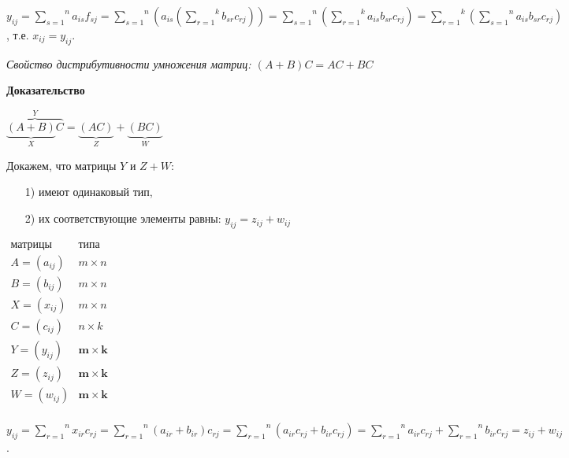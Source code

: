     $y_{ij} = \overset{n}{\underset{s = 1}{\sum}}a_{is}f_{sj} = \overset{n}{\underset{s = 1}{\sum}}(a_{is}(\overset{k}{\underset{r = 1}{\sum}}b_{sr}c_{rj})) = \overset{n}{\underset{s = 1}{\sum}}(\overset{k}{\underset{r = 1}{\sum}}a_{is}b_{sr}c_{rj}) = \overset{k}{\underset{r = 1}{\sum}}(\overset{n}{\underset{s = 1}{\sum}}a_{is}b_{sr}c_{rj})$, т.е. $x_{ij} = y_{ij}$.

    \ep

    \textit {Свойство дистрибутивности умножения матриц: $(A + B)C = AC + BC$}

    \vspace*{15pt}

    {\bf{Доказательство}}
    
    \vspace*{15pt}

    $\overbrace{\underbrace{(A + B)}_{X}C}^{Y} = \underbrace{(AC)}_{Z} +\underbrace{(BC)} _{W}$

    Докажем, что матрицы $Y$ и $Z + W$:
\begin{enumerate}
    \item[1)] имеют одинаковый тип,
    \item[2)] их соответствующие элементы равны: $y_{ij} = z_{ij} + w_{ij}$ 
\end{enumerate}

$
    \begin{array}{ c|c } 
     \text {матрицы} & \text{типа} \\
     \hline
     A = (a_{ij}) & m \times n \\ 
     B = (b_{ij}) & m \times n \\ 
     X = (x_{ij}) & m \times n \\  
     C = (c_{ij}) & n \times k \\ 
     Y = (y_{ij}) & \mathbf{m \times k} \\ 
     Z = (z_{ij}) & \mathbf{m \times k} \\ 
     W = (w_{ij}) & \mathbf{m \times k} \\ 
    \end{array} 
$

    \vspace*{15pt}
    $y_{ij} = \overset{n}{\underset{r = 1}{\sum}}x_{ir}c_{rj} = \overset{n}{\underset{r = 1}{\sum}}(a_{ir} + b_{ir})c_{rj} = \overset{n}{\underset{r = 1}{\sum}}(a_{ir}c_{rj} + b_{ir}c_{rj}) = \overset{n}{\underset{r = 1}{\sum}}a_{ir}c_{rj} + \overset{n}{\underset{r = 1}{\sum}}b_{ir}c_{rj} = z_{ij} + w_{ij}$.  

    \ep

